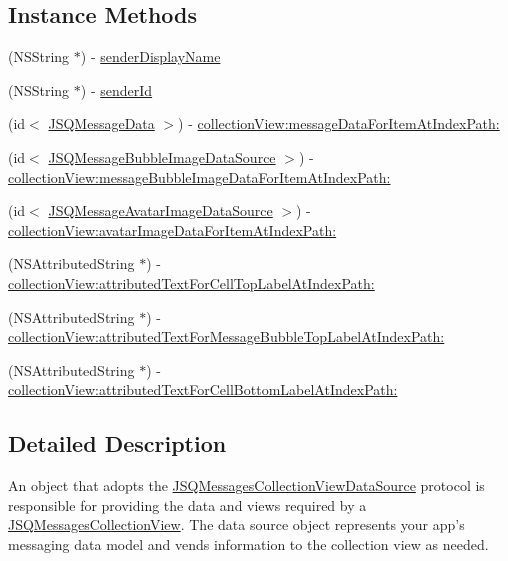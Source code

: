 \subsection*{Instance Methods}
\begin{DoxyCompactItemize}
\item 
(N\+S\+String $\ast$) -\/ \hyperlink{protocol_j_s_q_messages_collection_view_data_source-p_abe28cf725f1e33e1e3b642baba2bcef1}{sender\+Display\+Name}
\item 
(N\+S\+String $\ast$) -\/ \hyperlink{protocol_j_s_q_messages_collection_view_data_source-p_a9c3bc4eee84c672bfc71c199e99fc5d4}{sender\+Id}
\item 
(id$<$ \hyperlink{protocol_j_s_q_message_data-p}{J\+S\+Q\+Message\+Data} $>$) -\/ \hyperlink{protocol_j_s_q_messages_collection_view_data_source-p_aa4134f1dc1d00e6becb56618b8b78811}{collection\+View\+:message\+Data\+For\+Item\+At\+Index\+Path\+:}
\item 
(id$<$ \hyperlink{protocol_j_s_q_message_bubble_image_data_source-p}{J\+S\+Q\+Message\+Bubble\+Image\+Data\+Source} $>$) -\/ \hyperlink{protocol_j_s_q_messages_collection_view_data_source-p_a9c42dbd1b26d48cc2e4df29de57e5846}{collection\+View\+:message\+Bubble\+Image\+Data\+For\+Item\+At\+Index\+Path\+:}
\item 
(id$<$ \hyperlink{protocol_j_s_q_message_avatar_image_data_source-p}{J\+S\+Q\+Message\+Avatar\+Image\+Data\+Source} $>$) -\/ \hyperlink{protocol_j_s_q_messages_collection_view_data_source-p_ae1b8e5ed9ca6393704ed4a2252a3bc01}{collection\+View\+:avatar\+Image\+Data\+For\+Item\+At\+Index\+Path\+:}
\item 
(N\+S\+Attributed\+String $\ast$) -\/ \hyperlink{protocol_j_s_q_messages_collection_view_data_source-p_ad36bcfe4f547d5f7f1d3843401f94321}{collection\+View\+:attributed\+Text\+For\+Cell\+Top\+Label\+At\+Index\+Path\+:}
\item 
(N\+S\+Attributed\+String $\ast$) -\/ \hyperlink{protocol_j_s_q_messages_collection_view_data_source-p_a08a0a35945132c8ec67e9d4d12504cd9}{collection\+View\+:attributed\+Text\+For\+Message\+Bubble\+Top\+Label\+At\+Index\+Path\+:}
\item 
(N\+S\+Attributed\+String $\ast$) -\/ \hyperlink{protocol_j_s_q_messages_collection_view_data_source-p_a8b226562e24f8af105bd984fdec91d53}{collection\+View\+:attributed\+Text\+For\+Cell\+Bottom\+Label\+At\+Index\+Path\+:}
\end{DoxyCompactItemize}


\subsection{Detailed Description}
An object that adopts the {\ttfamily \hyperlink{protocol_j_s_q_messages_collection_view_data_source-p}{J\+S\+Q\+Messages\+Collection\+View\+Data\+Source}} protocol is responsible for providing the data and views required by a {\ttfamily \hyperlink{interface_j_s_q_messages_collection_view}{J\+S\+Q\+Messages\+Collection\+View}}. The data source object represents your app’s messaging data model and vends information to the collection view as needed. 

